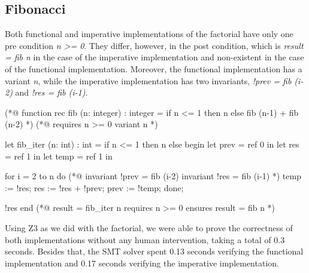 \subsection{Fibonacci}
\label{sub:fibonacci}

Both functional and imperative implementations of the factorial have only one pre condition \emph{n >= 0}.
They differ, however, in the post condition, which is \emph{result = fib n} in the case of the imperative implementation and non-existent in the case of the functional implementation.
Moreover, the functional implementation has a variant \emph{n}, while the imperative implementation has two invariants, \emph{!prev = fib (i-2)} and \emph{!res = fib (i-1)}. 

\begin{minipage}{\linewidth}
\begin{gospel}
  (*@ function rec fib (n: integer) : integer =
  if n <= 1 then n else fib (n-1) + fib (n-2) *)
  (*@ requires n >= 0 
    variant n *)
\end{gospel}
\end{minipage}

\bigskip

\begin{minipage}{\linewidth}
\begin{ocamlenv}
  let fib_iter (n: int) : int =
    if n <= 1 then n
    else
      begin
        let prev = ref 0 in 
        let res = ref 1 in
        let temp = ref 1 in

        for i = 2 to n do
          (*@ invariant !prev = fib (i-2)
            invariant !res = fib (i-1) *)
          temp := !res;
          res := !res + !prev;
          prev := !temp;
        done;

        !res
      end
  (*@ result = fib_iter n
    requires n >= 0 
    ensures result = fib n *)
\end{ocamlenv}
\end{minipage}

\bigskip

Using Z3 as we did with the factorial, we were able to prove the correctness of both implementations without any human intervention, taking a total of 0.3 seconds.
Besides that, the SMT solver spent 0.13 seconds verifying the functional implementation and 0.17 seconds verifying the imperative implementation.

